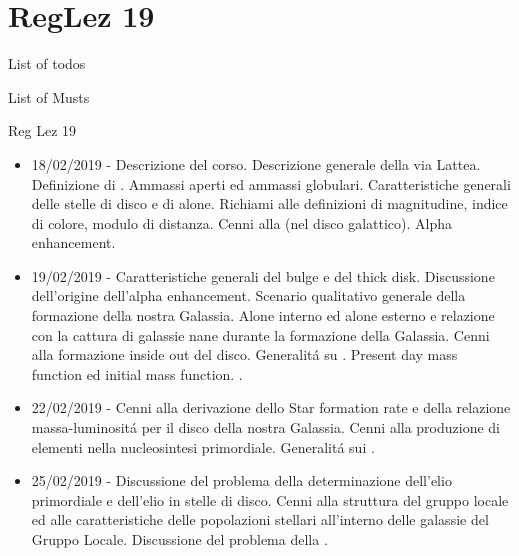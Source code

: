 \section{RegLez 19}

\begin{frame}[allowframebreaks]{List of todos}
\listoftodos
\end{frame}


\begin{frame}[allowframebreaks]{List of Musts}
 \listofmusts
\end{frame}

\begin{frame}[allowframebreaks]{Reg Lez 19}
%
\begin{itemize}
\item 18/02/2019 - Descrizione del corso. Descrizione generale della via Lattea. Definizione di . Ammassi aperti ed ammassi globulari. Caratteristiche generali delle stelle di disco e di alone. Richiami alle definizioni di magnitudine, indice di colore, modulo di distanza. Cenni alla  (nel disco galattico). Alpha enhancement. 
\item 19/02/2019 - Caratteristiche generali del bulge e del thick disk. Discussione dell'origine dell'alpha enhancement. Scenario qualitativo generale della formazione della nostra Galassia. Alone interno ed alone esterno e relazione con la cattura di galassie nane durante la formazione della Galassia. Cenni alla formazione inside out del disco. Generalit\'a su . Present day mass function ed initial mass function. . 
\item 22/02/2019 - Cenni alla derivazione dello Star formation rate e della relazione massa-luminosit\'a per il disco della nostra Galassia. Cenni alla produzione di elementi nella nucleosintesi primordiale. Generalit\'a sui . 
\item 25/02/2019 - Discussione del problema della determinazione dell'elio primordiale e dell'elio in stelle di disco. Cenni alla struttura del gruppo locale ed alle caratteristiche delle popolazioni stellari all'interno delle galassie del Gruppo Locale. Discussione del problema della . 

\end{itemize}
\end{frame}
